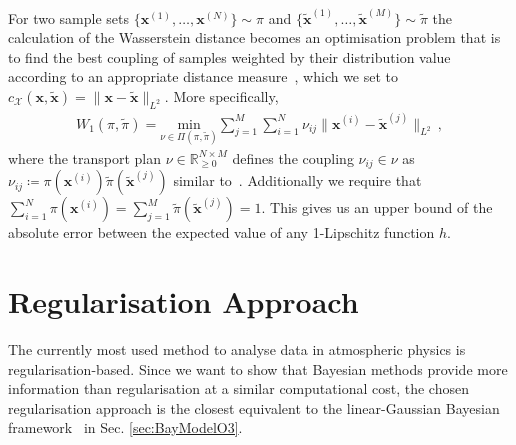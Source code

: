 For two sample sets $\{ \bm{x}^{(1)},\dots,\bm{x}^{(N)}\} \sim \pi$ and $\{\tilde{ \bm{x}}^{(1)},\dots,\tilde{\bm{x}}^{(M)}\} \sim \tilde{\pi}$ the calculation of the Wasserstein distance becomes an optimisation problem that is to find the best coupling of samples weighted by their distribution value according to an appropriate distance measure~\cite{feydy2020OT}, which we set to $c_{\mathcal{X}}(\bm{x},\tilde{\bm{x}})= \lVert \bm{x} -\tilde{\bm{x}} \rVert_{L^2} $.
More specifically,
\begin{align}
	W_1(\pi,\tilde{\pi}) = 	\underset{\nu \in \Pi(\pi,\tilde{\pi}) }{\text{min}} \sum^M_{j = 1} \sum^N_{i =1}  \nu_{ij} \lVert\bm{x}^{(i)}  -  \tilde{\bm{x}}^{(j)} \rVert_{L^2} \, , \label{eq:applWasser}
\end{align}
where the transport plan $\nu \in \mathbb{R}^{N \times M}_ {\geq 0}$ defines the coupling $\nu_{ij} \in \nu $ as $ \nu_{ij} \coloneqq \pi(\bm{x}^{(i)}) \tilde{\pi}(\tilde{\bm{x}}^{(j)})$ similar to~\cite[Eq. 3.166]{feydy2020OT}.
Additionally we require that $\sum^N_{i =1} \pi(\bm{x}^{(i)}) = \sum^M_{j = 1} \tilde{\pi}(\tilde{\bm{x}}^{(j)})= 1 $.
This gives us an upper bound of the absolute error between the expected value of any 1-Lipschitz function $h$.



\section{Regularisation Approach}
\label{sec:reg}

The currently most used method to analyse data in atmospheric physics is regularisation-based.
Since we want to show that Bayesian methods provide more information than regularisation at a similar computational cost, the chosen regularisation approach is the closest equivalent to the linear-Gaussian Bayesian framework~\cite{fox2016fast} in Sec. \ref{sec:BayModelO3}.

